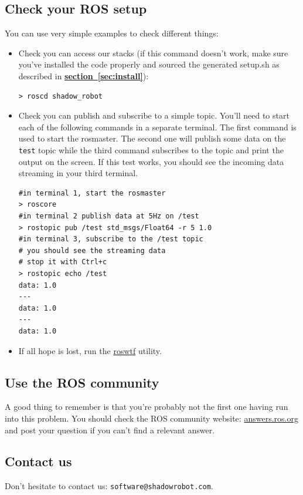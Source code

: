 \documentclass[12pt]{article}
\newcommand{\link}[1]{\hyperref[sec:#1]{\textbf{section~\ref*{sec:#1}}}}
\begin{document}
\subsection{Check your ROS setup}
\par You can use very simple examples to check different things:
\begin{itemize}
\item Check you can access our stacks (if this command doesn't work, make sure you've installed the code properly and sourced the generated setup.sh as described in \link{install}):
  \begin{lstlisting}[escapeinside='']
> roscd shadow_robot
  \end{lstlisting}

\item Check you can publish and subscribe to a simple topic. You'll need to start each of the following commands in a separate terminal. The first command is used to start the rosmaster. The second one will publish some data on the \texttt{test} topic while the third command subscribes to the topic and print the output on the screen. If this test works, you should see the incoming data streaming in your third terminal.

  \begin{lstlisting}[escapeinside='']
#in terminal 1, start the rosmaster
> roscore
#in terminal 2 publish data at 5Hz on /test
> rostopic pub /test std_msgs/Float64 -r 5 1.0
#in terminal 3, subscribe to the /test topic
# you should see the streaming data
# stop it with Ctrl+c
> rostopic echo /test
data: 1.0
---
data: 1.0
---
data: 1.0
  \end{lstlisting}

\item If all hope is lost, run the \href{http://ros.org/wiki/roswtf}{roswtf} utility.
\end{itemize}

\subsection{Use the ROS community}
\label{sec:use-ros-community}
\par A good thing to remember is that you're probably not the first one having run into this problem. You should check the ROS community website: \href{http://answers.ros.org}{answers.ros.org} and post your question if you can't find a relevant answer.

\subsection{Contact us}
\par Don't hesitate to contact us: \texttt{software@shadowrobot.com}.
\end{document}
